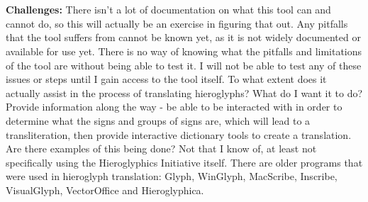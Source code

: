 \documentclass{article}
\begin{document}
\paragraph{} ~\\ \noindent \textbf{Challenges:}
\newline \break \noindent
There isn't a lot of documentation on what this tool can and cannot do, so this will actually be an exercise in figuring that out.
\newline \break \noindent
Any pitfalls that the tool suffers from cannot be known yet, as it is not widely documented or available for use yet.
\newline \break \noindent
There is no way of knowing what the pitfalls and limitations of the tool are without being able to test it.
\newline \break \noindent
I will not be able to test any of these issues or steps until I gain access to the tool itself.
\newline \break \noindent
To what extent does it actually assist in the process of translating hieroglyphs?
\newline \break \noindent
What do I want it to do? Provide information along the way - be able to be interacted with in order to determine what the signs and groups of signs are, which will lead to a transliteration, then provide interactive dictionary tools to create a translation.
\newline \break \noindent
Are there examples of this being done? Not that I know of, at least not specifically using the Hieroglyphics Initiative itself. There are older programs that were used in hieroglyph translation: Glyph, WinGlyph, MacScribe, Inscribe, VisualGlyph, VectorOffice and Hieroglyphica.

\end{document}
